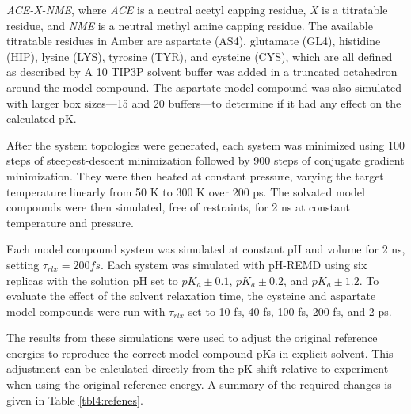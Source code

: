 \emph{ACE-X-NME}, where \emph{ACE} is a neutral acetyl capping residue, \emph{X}
is a titratable residue, and \emph{NME} is a neutral methyl amine capping
residue.  \cite{Mongan_JComputChem_2004_v25_p2038} The available titratable
residues in Amber are aspartate (AS4), glutamate (GL4), histidine (HIP), lysine
(LYS), tyrosine (TYR), and cysteine (CYS), which are all defined as described by
\citeauthor{Mongan_JComputChem_2004_v25_p2038}
\cite{Mongan_JComputChem_2004_v25_p2038}  A 10 \text{\AA} TIP3P
\cite{Jorgensen_JChemPhys_1983_v79_p926} solvent buffer was added in a truncated
octahedron around the model compound.  The aspartate model compound was also
simulated with larger box sizes---15 \text{\AA} and 20 \text{\AA} buffers---to
determine if it had any effect on the calculated pK.

After the system topologies were generated, each system was minimized using 100
steps of steepest-descent minimization followed by 900 steps of conjugate
gradient minimization.  They were then heated at constant pressure, varying the
target temperature linearly from 50 K to 300 K over 200 ps.  The solvated model
compounds were then simulated, free of restraints, for 2 ns at constant
temperature and pressure.

Each model compound system was simulated at constant pH and volume for 2 ns,
setting $\tau_{rlx} = 200 fs$. Each system was simulated with pH-REMD using six
replicas with the solution pH set to $pK_a \pm 0.1$, $pK_a \pm 0.2$, and $pK_a
\pm 1.2$. To evaluate the effect of the solvent relaxation time, the cysteine
and aspartate model compounds were run with $\tau_{rlx}$ set to 10 fs, 40 fs,
100 fs, 200 fs, and 2 ps.

The results from these simulations were used to adjust the original reference
energies to reproduce the correct model compound pKs in explicit solvent.
This adjustment can be calculated directly from the pK shift relative to
experiment when using the original reference energy. A summary of the required
changes is given in Table \ref{tbl4:refenes}.

